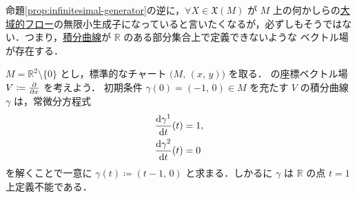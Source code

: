 \documentclass[geometry_main]{subfiles}
\begin{document}
命題\ref{prop:infinitesimal-generator}の逆に，$\forall X \in \mathfrak{X}(M)$ が $M$ 上の何かしらの\hyperref[def:global-flow]{大域的フロー}の無限小生成子になっていると言いたくなるが，必ずしもそうではない．つまり，\hyperref[def:integral-curve]{積分曲線}が $\mathbb{R}$ のある部分集合上で定義できないような \cinfty ベクトル場が存在する．

\begin{myexample}[label=ex:local-flow]{}
    $M = \mathbb{R}^2 \setminus \{0\}$ とし，標準的なチャート $\bigl(M,\, (x,\, y)\bigr)$ を取る．
    の座標ベクトル場 $V \coloneqq \pdv{}{x}$ を考えよう．
    初期条件 $\gamma (0) = (-1,\, 0) \in M$ を充たす $V$ の積分曲線 $\gamma$ は，常微分方程式
    \begin{align}
        \dv{\gamma^1}{t}()(t) &= 1, \\
        \dv{\gamma^2}{t}()(t)&= 0
    \end{align}
    を解くことで一意に $\gamma(t) \coloneqq (t-1,\, 0)$ と求まる．しかるに $\gamma$ は $\mathbb{R}$ の点 $t = 1$ 上定義不能である．
\end{myexample}
\end{document}
